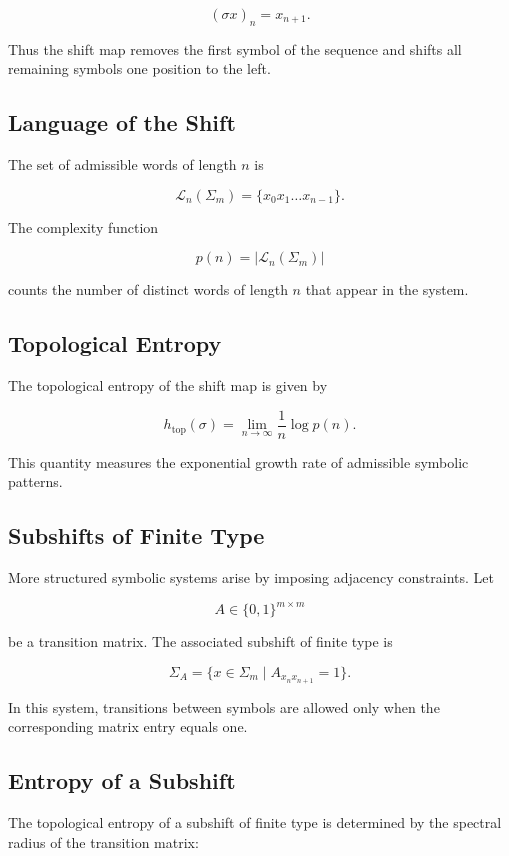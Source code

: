\documentclass[12pt]{article}
\begin{document}
\[
(\sigma x)_n = x_{n+1}.
\]

Thus the shift map removes the first symbol of the sequence and shifts all remaining symbols one position to the left.

\subsection{Language of the Shift}

The set of admissible words of length $n$ is

\[
\mathcal{L}_n(\Sigma_m)
=
\{x_0x_1\dots x_{n-1}\}.
\]

The complexity function

\[
p(n)=|\mathcal{L}_n(\Sigma_m)|
\]

counts the number of distinct words of length $n$ that appear in the system.

\subsection{Topological Entropy}

The topological entropy of the shift map is given by

\[
h_{\mathrm{top}}(\sigma)
=
\lim_{n\to\infty}
\frac{1}{n}\log p(n).
\]

This quantity measures the exponential growth rate of admissible symbolic patterns.

\subsection{Subshifts of Finite Type}

More structured symbolic systems arise by imposing adjacency constraints. Let

\[
A \in \{0,1\}^{m\times m}
\]

be a transition matrix. The associated subshift of finite type is

\[
\Sigma_A
=
\{x \in \Sigma_m \mid A_{x_n x_{n+1}}=1\}.
\]

In this system, transitions between symbols are allowed only when the corresponding matrix entry equals one.

\subsection{Entropy of a Subshift}

The topological entropy of a subshift of finite type is determined by the spectral radius of the transition matrix:
\end{document}
